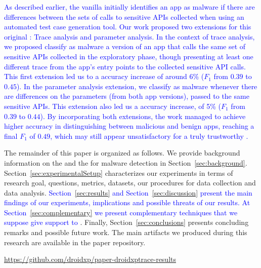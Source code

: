 
\textcolor{blue}{As described earlier, the vanilla \mas initially identifies an app as malware if there are differences between the sets of calls to sensitive APIs collected when using an automated test case generation tool. Our work proposed two extensions for this original \mas: Trace analysis and parameter analysis. In the context of trace analysis, we proposed classify as malware a version of an app that calls the same set of sensitive APIs collected in the exploratory phase, though presenting at least one different trace from the app's entry points to the collected sensitive API calls. This first extension led us to a accuracy increase of around 6\% ($F_1$ from $0.39$ to $0.45$). In the parameter analysis extension, we classify as malware whenever there are differences on the parameters (from both app versions), passed to the same sensitive APIs. This extension also led us a accuracy increase, of 5\% ($F_1$ from $0.39$ to $0.44$). By incorporating both extensions, the work managed to achieve higher accuracy in distinguishing between malicious and benign apps, reaching a final $F_1$ of $0.49$, which may still appear unsatisfactory for a truly trustworthy \mas.}

The remainder of this paper is organized as follows. 
We provide background information on the \mas and the \mas for malware detection in
Section~\ref{sec:background}. Section~\ref{sec:experimentalSetup}
characterizes our experiments in terms of research goal, questions, metrics, datasets, our procedures for data collection and data analysis. \textcolor{blue}{Section~\ref{sec:results} and Section~\ref{sec:discussion} present the main findings of our experiments, implications and possible threats of our results. At Section~\ref{sec:complementary} we present complementary techniques that we suppose give support to \mas}. Finally,
Section~\ref{sec:conclusions} presents concluding remarks and possible future
work. The main artifacts we produced during this research are available in the
paper repository.

\begin{small}
  \begin{center}
    \url{https://github.com/droidxp/paper-droidxptrace-results}
  \end{center}
\end{small}
